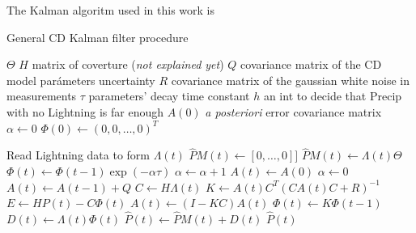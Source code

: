 \documentclass[11pt]{article}
\begin{document}
The Kalman algoritm used in this work is

\begin{algorithm} 
\caption{General CD Kalman filter procedure} 
\begin{algorithmic}[1]
\REQUIRE $\Theta$
\REQUIRE $H$ matrix of coverture (\emph{not explained yet})
\REQUIRE $Q$ covariance matrix of the CD model parámeters uncertainty
\REQUIRE $R$ covariance matrix of the gaussian white noise in measurements
\REQUIRE $\tau$ parameters' decay time constant
\REQUIRE $h$ an int to decide that Precip with no Lightning is far enough 
\REQUIRE $A(0)$ \emph{a posteriori} error covariance matrix
\STATE $\alpha \leftarrow 0$
\STATE $\Phi(0) \leftarrow (0, 0, \ldots, 0)^T$

           \STATE Read Lightning data to form $\Lambda (t)$
                     \STATE $\hat{P}M(t) \leftarrow [0, \ldots, 0]]$
           \ELSE
                      \STATE $\hat{P}M(t) \leftarrow \Lambda(t) \Theta$
           \ENDIF
                      \STATE $\Phi(t) \leftarrow \Phi(t-1) \exp(-\alpha \tau)$
                      \STATE $\alpha \leftarrow \alpha + 1$
                                   \STATE $A(t) \leftarrow A(0)$
                      \ENDIF
                      \STATE $\alpha \leftarrow 0$
                      \STATE $A(t) \leftarrow A(t-1) + Q$
                      \STATE $C \leftarrow H \Lambda(t)$
                      \STATE $K \leftarrow A(t) C^T (C A(t) C + R)^{-1}$ 
                      \STATE $E \leftarrow H P(t) - C\Phi(t) $
                      \STATE $A(t) \leftarrow (I - KC)A(t)$
                      \STATE $\Phi(t) \leftarrow K \Phi(t-1)$ 
          \ENDIF
          \STATE $D(t) \leftarrow \Lambda(t) \Phi(t)$
          \STATE $\hat{P}(t) \leftarrow \hat{P}M(t) + D(t)$
\ENDFOR
\ENSURE $\hat{P}(t)$

\end{algorithmic}
\end{algorithm}
\end{document}
